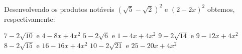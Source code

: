 Desenvolvendo os produtos notáveis $(\sqrt{5}-\sqrt{2})^2$ e $(2-2x)^2$ obtemos, respectivamente:

$7-2\sqrt{10}$ e $4-8x+4x^2$
$5-2\sqrt{6}$ e $1-4x+4x^2$
$9-2\sqrt{14}$ e $9-12x+4x^2$
$8-2\sqrt{15}$ e $16-16x+4x^2$
$10-2\sqrt{21}$ e $25-20x+4x^2$


